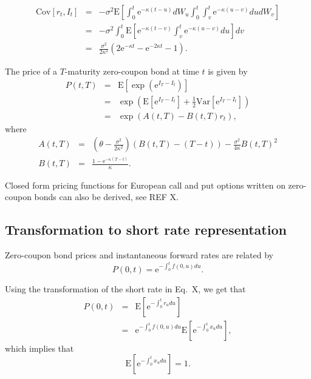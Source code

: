 \documentclass{report}
\newcommand{\E}{\mathrm{E}}
\newcommand{\Var}{\mathrm{Var}}
\newcommand{\Cov}{\mathrm{Cov}}
\newcommand{\e}{\text{e}}
\begin{document}
\begin{eqnarray}
\Cov \left[ r_t, I_t \right] &=& - \sigma^2 \E \left[ \int_0^t \e^{-\kappa (t - u)} dW_u \int_0^t \int_v^t \e^{-\kappa(u-v)} du dW_v \right] \\
&=& -\sigma^2 \int_0^t \E \left[ \e^{-\kappa(t-v)} \int_v^t \e^{-\kappa(u-v)} du \right] dv \\
&=& \frac{\sigma^2}{2 \kappa^2} \left( 2 \e^{-\kappa t} - \e^{-2\kappa t} - 1 \right).
\end{eqnarray}

The price of a $T$-maturity zero-coupon bond at time $t$ is given by
\begin{eqnarray}
P(t,T) &=& \E \left[ \exp \left(\text{e}^{I_T - I_t} \right) \right] \\
&=& \exp \left( \E \left[ \text{e}^{I_T - I_t} \right] + \frac{1}{2} \Var \left[ \text{e}^{I_T - I_t} \right] \right) \\
&=& \exp \left( A(t,T) - B(t,T) r_t \right) ,
\end{eqnarray}
where
\begin{eqnarray}
A(t,T) &=& \left( \theta - \frac{\sigma^2}{2 \kappa^2} \right) \left( B(t,T) - (T- t)\right) - \frac{\sigma^2}{4 \kappa} B(t,T)^2 \\
B(t,T) &=& \frac{1 - \text{e}^{-\kappa (T-t)}}{\kappa}.
\end{eqnarray}

Closed form pricing functions for European call and put options written on zero-coupon bonds can also be derived, see REF X.

\subsection{Transformation to short rate representation}

Zero-coupon bond prices and instantaneous forward rates are related by
\begin{equation}
P(0,t) = \e^{- \int_0^t f(0,u) du}.
\end{equation}

Using the transformation of the short rate in Eq.~X, we get that
\begin{eqnarray}
P(0,t) &=& \E \left[ \e^{- \int_0^t r_u du} \right] \\
&=& \e^{- \int_0^t f(0,u) du} \E \left[ \e^{- \int_0^t x_u du} \right],
\end{eqnarray}
which implies that
\begin{equation}
\E \left[ \e^{- \int_0^t x_u du} \right] = 1.
\end{equation}
\end{document}
